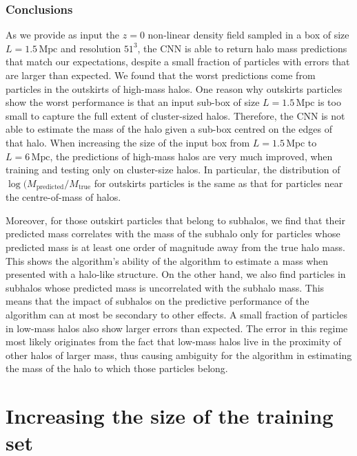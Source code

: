 \documentclass[11pt]{article}
\begin{document}
\subsubsection{Conclusions}
As we provide as input the $z=0$ non-linear density field sampled in a box of size $L=1.5 \, \mathrm{Mpc}$ and resolution $51^3$, the CNN is able to return halo mass predictions that match our expectations, despite a small fraction of particles with errors that are larger than expected. We found that the worst predictions come from particles in the outskirts of high-mass halos. One reason why outskirts particles show the worst performance is that an input sub-box of size $L=1.5 \, \mathrm{Mpc}$ is too small to capture the full extent of cluster-sized halos. Therefore, the CNN is not able to estimate the mass of the halo given a sub-box centred on the edges of that halo. When increasing the size of the input box from $L=1.5 \, \mathrm{Mpc}$ to $L=6 \, \mathrm{Mpc}$, the predictions of high-mass halos are very much improved, when training and testing only on cluster-size halos.
In particular, the distribution of $\log(M_\mathrm{predicted}/M_\mathrm{true}$ for outskirts particles is the same as that for particles near the centre-of-mass of halos.

Moreover, for those outskirt particles that belong to subhalos, we find that their predicted mass correlates with the mass of the subhalo only for particles whose predicted mass is at least one order of magnitude away from the true halo mass. This shows the algorithm's ability of the algorithm to estimate a mass when presented with a halo-like structure. On the other hand, we also find particles in subhalos whose predicted mass is uncorrelated with the subhalo mass. This means that the impact of subhalos on the predictive performance of the algorithm can at most be secondary to other effects.
A small fraction of particles in low-mass halos also show larger errors than expected. The error in this regime most likely originates from the fact that low-mass halos live in the proximity of other halos of larger mass, thus causing ambiguity for the algorithm in estimating the mass of the halo to which those particles belong.


\section{Increasing the size of the training set}
\end{document}
